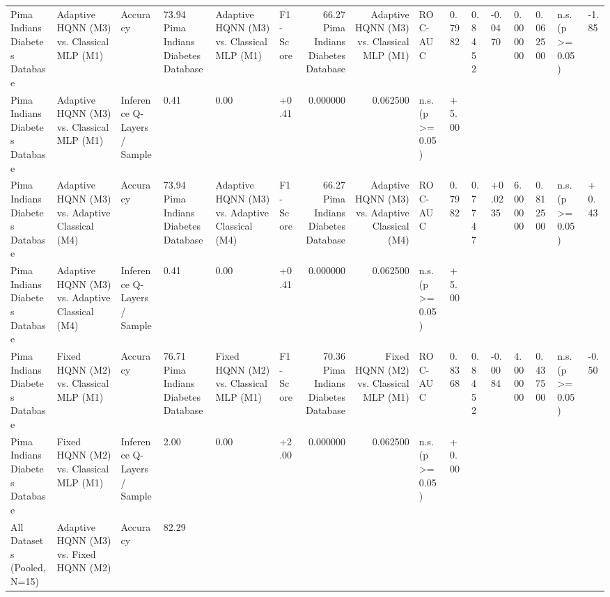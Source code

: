 \begin{table}
\begin{tabular}{llllllrrll}
Pima Indians Diabetes Database & Adaptive HQNN (M3) vs. Classical MLP (M1) & Accuracy & 73.94%
Pima Indians Diabetes Database & Adaptive HQNN (M3) vs. Classical MLP (M1) & F1-Score & 66.27%
Pima Indians Diabetes Database & Adaptive HQNN (M3) vs. Classical MLP (M1) & ROC-AUC & 0.7982 & 0.8452 & -0.0470 & 0.000000 & 0.062500 & n.s. (p >= 0.05) & -1.85 \\
Pima Indians Diabetes Database & Adaptive HQNN (M3) vs. Classical MLP (M1) & Inference Q-Layers / Sample & 0.41 & 0.00 & +0.41 & 0.000000 & 0.062500 & n.s. (p >= 0.05) & +5.00 \\
Pima Indians Diabetes Database & Adaptive HQNN (M3) vs. Adaptive Classical (M4) & Accuracy & 73.94%
Pima Indians Diabetes Database & Adaptive HQNN (M3) vs. Adaptive Classical (M4) & F1-Score & 66.27%
Pima Indians Diabetes Database & Adaptive HQNN (M3) vs. Adaptive Classical (M4) & ROC-AUC & 0.7982 & 0.7747 & +0.0235 & 6.000000 & 0.812500 & n.s. (p >= 0.05) & +0.43 \\
Pima Indians Diabetes Database & Adaptive HQNN (M3) vs. Adaptive Classical (M4) & Inference Q-Layers / Sample & 0.41 & 0.00 & +0.41 & 0.000000 & 0.062500 & n.s. (p >= 0.05) & +5.00 \\
Pima Indians Diabetes Database & Fixed HQNN (M2) vs. Classical MLP (M1) & Accuracy & 76.71%
Pima Indians Diabetes Database & Fixed HQNN (M2) vs. Classical MLP (M1) & F1-Score & 70.36%
Pima Indians Diabetes Database & Fixed HQNN (M2) vs. Classical MLP (M1) & ROC-AUC & 0.8368 & 0.8452 & -0.0084 & 4.000000 & 0.437500 & n.s. (p >= 0.05) & -0.50 \\
Pima Indians Diabetes Database & Fixed HQNN (M2) vs. Classical MLP (M1) & Inference Q-Layers / Sample & 2.00 & 0.00 & +2.00 & 0.000000 & 0.062500 & n.s. (p >= 0.05) & +0.00 \\
All Datasets (Pooled, N=15) & Adaptive HQNN (M3) vs. Fixed HQNN (M2) & Accuracy & 82.29%

\end{tabular}
\end{table}
